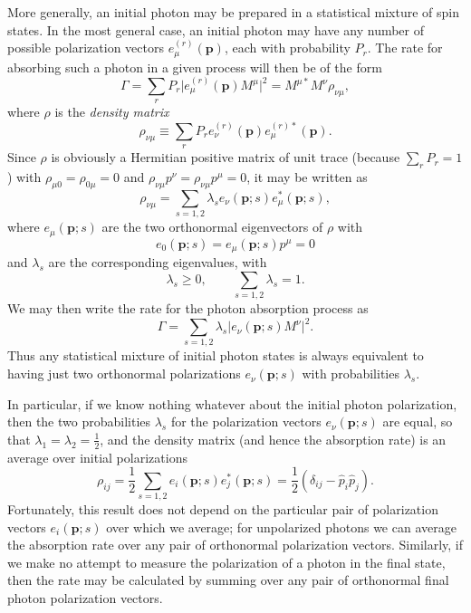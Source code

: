 More generally, an initial photon may be prepared in a statistical mixture of
spin states. In the most general case, an initial photon may have any number of
possible polarization vectors $e_\mu^{(r)}(\mathbf p)$, each with probability
$P_r$. The rate for absorbing such a photon in a given process will then be of
the form
\begin{equation}
\Gamma=\sum_rP_r\lvert e_\mu^{(r)}(\mathbf p)M^\mu\rvert^2
=M^{\mu *}M^\nu\rho_{\nu\mu},
\tag{8.6.20}\label{eq:8.6.20}
\end{equation}
where $\rho$ is the \emph{density matrix}
\begin{equation}
\rho_{\nu\mu}\equiv\sum_rP_r
e_\nu^{(r)}(\mathbf p)e_\mu^{(r)*}(\mathbf p).
\tag{8.6.21}\label{eq:8.6.21}
\end{equation}
Since $\rho$ is obviously a Hermitian positive matrix of unit trace (because
$\sum_rP_r=1$) with $\rho_{\mu0}=\rho_{0\mu}=0$ and
$\rho_{\nu\mu}p^\nu=\rho_{\nu\mu}p^\mu=0$, it may be written as
\begin{equation}
\rho_{\nu\mu}=\sum_{s=1,2}\lambda_s
e_\nu(\mathbf p;s)e_\mu^*(\mathbf p;s),
\tag{8.6.22}\label{eq:8.6.22}
\end{equation}
where $e_\mu(\mathbf p;s)$ are the two orthonormal eigenvectors of $\rho$ with
\begin{equation}
e_0(\mathbf p;s)=e_\mu(\mathbf p;s)p^\mu=0
\tag{8.6.23}\label{eq:8.6.23}
\end{equation}
and $\lambda_s$ are the corresponding eigenvalues, with
\[
\lambda_s\geq0,\qquad \sum_{s=1,2}\lambda_s=1.
\]
We may then write the rate for the photon absorption process as
\begin{equation}
\Gamma=\sum_{s=1,2}\lambda_s
\lvert e_\nu(\mathbf p;s)M^\nu\rvert^2.
\tag{8.6.24}\label{eq:8.6.24}
\end{equation}
Thus any statistical mixture of initial photon states is always equivalent to
having just two orthonormal polarizations $e_\nu(\mathbf p;s)$ with
probabilities $\lambda_s$.

In particular, if we know nothing whatever about the initial photon
polarization, then the two probabilities $\lambda_s$ for the polarization
vectors $e_\nu(\mathbf p;s)$ are equal, so that
$\lambda_1=\lambda_2=\frac12$, and the density matrix (and hence the
absorption rate) is an average over initial polarizations
\begin{equation}
\rho_{ij}=\frac12\sum_{s=1,2}
e_i(\mathbf p;s)e_j^*(\mathbf p;s)
=\frac12(\delta_{ij}-\widehat p_i\widehat p_j).
\tag{8.6.25}\label{eq:8.6.25}
\end{equation}
Fortunately, this result does not depend on the particular pair of
polarization vectors $e_i(\mathbf p;s)$ over which we average; for unpolarized
photons we can average the absorption rate over any pair of orthonormal
polarization vectors. Similarly, if we make no attempt to measure the
polarization of a photon in the final state, then the rate may be calculated
by summing over any pair of orthonormal final photon polarization vectors.


